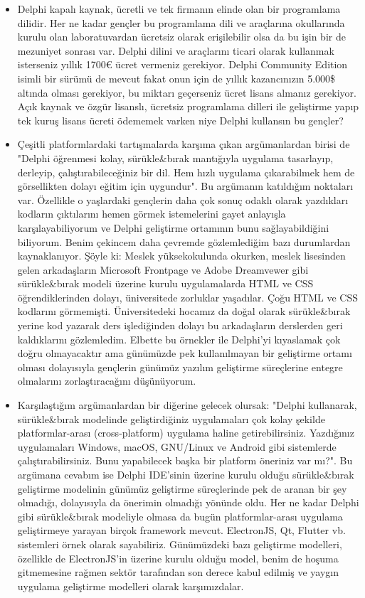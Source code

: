 \documentclass[11pt]{article}
\begin{document}
\begin{itemize}
\item Delphi kapalı kaynak, ücretli ve tek firmanın elinde olan bir programlama
dilidir. Her ne kadar gençler bu programlama dili ve araçlarına okullarında
kurulu olan laboratuvardan ücretsiz olarak erişilebilir olsa da bu işin bir
de mezuniyet sonrası var. Delphi dilini ve araçlarını ticari olarak
kullanmak isterseniz yıllık 1700€ ücret vermeniz gerekiyor. Delphi Community
Edition isimli bir sürümü de mevcut fakat onun için de yıllık kazancınızın
5.000\$ altında olması gerekiyor, bu miktarı geçerseniz ücret lisans almanız
gerekiyor. Açık kaynak ve özgür lisanslı, ücretsiz programlama dilleri ile
geliştirme yapıp tek kuruş lisans ücreti ödememek varken niye Delphi
kullansın bu gençler?
\item Çeşitli platformlardaki tartışmalarda karşıma çıkan argümanlardan birisi de
"Delphi öğrenmesi kolay, sürükle\&bırak mantığıyla uygulama tasarlayıp,
derleyip, çalıştırabileceğiniz bir dil. Hem hızlı uygulama çıkarabilmek hem
de görsellikten dolayı eğitim için uygundur". Bu argümanın katıldığım
noktaları var. Özellikle o yaşlardaki gençlerin daha çok sonuç odaklı olarak
yazdıkları kodların çıktılarını hemen görmek istemelerini gayet anlayışla
karşılayabiliyorum ve Delphi geliştirme ortamının bunu sağlayabildiğini
biliyorum. Benim çekincem daha çevremde gözlemlediğim bazı durumlardan
kaynaklanıyor. Şöyle ki: Meslek yüksekokulunda okurken, meslek lisesinden
gelen arkadaşların Microsoft Frontpage ve Adobe Dreamvewer gibi
sürükle\&bırak modeli üzerine kurulu uygulamalarda HTML ve CSS
öğrendiklerinden dolayı, üniversitede zorluklar yaşadılar. Çoğu HTML ve CSS
kodlarını görmemişti. Üniversitedeki hocamız da doğal olarak sürükle\&bırak
yerine kod yazarak ders işlediğinden dolayı bu arkadaşların derslerden geri
kaldıklarını gözlemledim. Elbette bu örnekler ile Delphi'yi kıyaslamak çok
doğru olmayacaktır ama günümüzde pek kullanılmayan bir geliştirme ortamı
olması dolayısıyla gençlerin günümüz yazılım geliştirme süreçlerine entegre
olmalarını zorlaştıracağını düşünüyorum.
\item Karşılaştığım argümanlardan bir diğerine gelecek olursak: "Delphi
kullanarak, sürükle\&bırak modelinde geliştirdiğiniz uygulamaları çok kolay
şekilde platformlar-arası (cross-platform) uygulama haline getirebilirsiniz.
Yazdığınız uygulamaları Windows, macOS, GNU/Linux ve Android gibi
sistemlerde çalıştırabilirsiniz. Bunu yapabilecek başka bir platform
öneriniz var mı?". Bu argümana cevabım ise Delphi IDE'sinin üzerine kurulu
olduğu sürükle\&bırak geliştirme modelinin günümüz geliştirme süreçlerinde
pek de aranan bir şey olmadığı, dolayısıyla da önerimin olmadığı yönünde
oldu. Her ne kadar Delphi gibi sürükle\&bırak modeliyle olmasa da bugün
platformlar-arası uygulama geliştirmeye yarayan birçok framework mevcut.
ElectronJS, Qt, Flutter vb. sistemleri örnek olarak sayabiliriz. Günümüzdeki
bazı geliştirme modelleri, özellikle de ElectronJS'in üzerine kurulu olduğu
model, benim de hoşuma gitmemesine rağmen sektör tarafından son derece kabul
edilmiş ve yaygın uygulama geliştirme modelleri olarak karşımızdalar.
\end{itemize}
\end{document}
